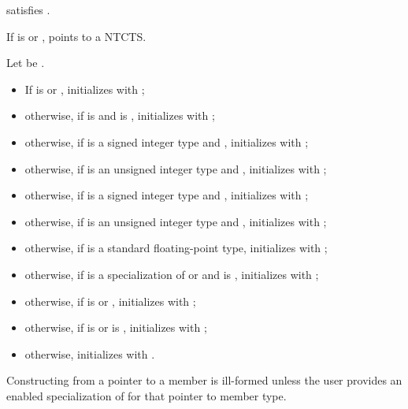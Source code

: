 \begin{itemdescr}
\pnum
\constraints
{} satisfies .

\pnum
\expects
If  is  or ,
 points to a NTCTS.

\pnum
\effects
Let  be .
\begin{itemize}
\item
If  is  or ,
initializes  with ;
\item
otherwise, if  is  and  is
, initializes  with
;
\item
otherwise, if  is a signed integer type
and ,
initializes  with ;
\item
otherwise, if  is an unsigned integer type and
, initializes
 with ;
\item
otherwise, if  is a signed integer type and
, initializes
 with ;
\item
otherwise, if  is an unsigned integer type and
, initializes
 with
;
\item
otherwise, if  is a standard floating-point type,
initializes  with ;
\item
otherwise, if  is
a specialization of  or  and
 is ,
initializes  with
;
\item
otherwise, if  is
 or ,
initializes  with ;
\item
otherwise, if  is  or
 is ,
initializes  with ;
\item
otherwise, initializes  with .
\end{itemize}
\begin{note}
Constructing  from a pointer to a member is ill-formed
unless the user provides an enabled specialization of 
for that pointer to member type.
\end{note}
\end{itemdescr}

